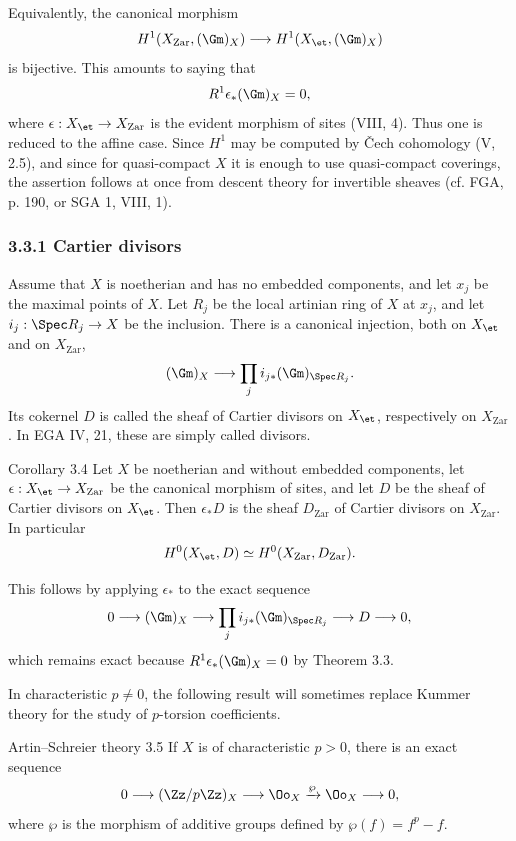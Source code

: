 Equivalently, the canonical morphism
\[
H^1(X_{\mathrm{Zar}},(\Gm)_X)\longrightarrow H^1(X_{\et},(\Gm)_X)
\]
is bijective. This amounts to saying that
\[
R^1\epsilon_*(\Gm)_X=0,
\]
where \(\epsilon:X_{\et}\to X_{\mathrm{Zar}}\) is the evident morphism of sites (VIII, 4). Thus one is reduced to the affine case. Since \(H^1\) may be computed by \v{C}ech cohomology (V, 2.5), and since for quasi-compact \(X\) it is enough to use quasi-compact coverings, the assertion follows at once from descent theory for invertible sheaves (cf. FGA, p. 190, or SGA 1, VIII, 1).

\subsubsection*{3.3.1 Cartier divisors}
Assume that \(X\) is noetherian and has no embedded components, and let \(x_j\) be the maximal points of \(X\). Let \(R_j\) be the local artinian ring of \(X\) at \(x_j\), and let \(i_j:\Spec R_j\to X\) be the inclusion. There is a canonical injection, both on \(X_{\et}\) and on \(X_{\mathrm{Zar}}\),
\[
(\Gm)_X\longrightarrow \prod_j i_{j*}(\Gm)_{\Spec R_j}.
\]
Its cokernel \(D\) is called the sheaf of Cartier divisors on \(X_{\et}\), respectively on \(X_{\mathrm{Zar}}\). In EGA IV, 21, these are simply called divisors.

\begin{statement}{Corollary 3.4}
Let \(X\) be noetherian and without embedded components, let \(\epsilon:X_{\et}\to X_{\mathrm{Zar}}\) be the canonical morphism of sites, and let \(D\) be the sheaf of Cartier divisors on \(X_{\et}\). Then \(\epsilon_*D\) is the sheaf \(D_{\mathrm{Zar}}\) of Cartier divisors on \(X_{\mathrm{Zar}}\). In particular
\[
H^0(X_{\et},D)\simeq H^0(X_{\mathrm{Zar}},D_{\mathrm{Zar}}).
\]
\end{statement}

This follows by applying \(\epsilon_*\) to the exact sequence
\[
0\longrightarrow (\Gm)_X\longrightarrow \prod_j i_{j*}(\Gm)_{\Spec R_j}\longrightarrow D\longrightarrow 0,
\]
which remains exact because \(R^1\epsilon_*(\Gm)_X=0\) by Theorem 3.3.

In characteristic \(p\ne 0\), the following result will sometimes replace Kummer theory for the study of \(p\)-torsion coefficients.

\begin{statement}{Artin--Schreier theory 3.5}
If \(X\) is of characteristic \(p>0\), there is an exact sequence
\[
0\longrightarrow (\Zz/p\Zz)_X\longrightarrow \Oo_X\xrightarrow{\wp}\Oo_X\longrightarrow 0,
\]
where \(\wp\) is the morphism of additive groups defined by \(\wp(f)=f^p-f\).
\end{statement}


